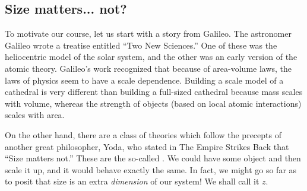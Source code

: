 
\subsection*{Size matters... not?}
To motivate our course, let us start with a story from Galileo. The astronomer Galileo wrote a treatise entitled ``Two New Sciences.'' One of these was the heliocentric model of the solar system, and the other was an early version of the atomic theory. Galileo's work recognized that because of area-volume laws, the laws of physics seem to have a scale dependence. Building a scale model of a cathedral is very different than building a full-sized cathedral because mass scales with volume, whereas the strength of objects (based on local atomic interactions) scales with area.

On the other hand, there are a class of theories which follow the precepts of another great philosopher, Yoda, who stated in The Empire Strikes Back that ``Size matters not.'' These are the so-called . We could have some object and then scale it up, and it would behave exactly the same. In fact, we might go so far as to posit that size is an extra \emph{dimension} of our system! We shall call it $z$.

